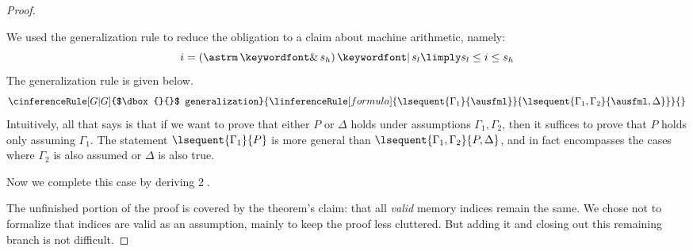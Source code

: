 \documentclass[11pt,twoside]{scrartcl}
\begin{document}
\begin{proof}
\begin{sequentdeduction}
{{  }
} {
}
\end{sequentdeduction}
We used the generalization rule to reduce the obligation to a claim about machine arithmetic, namely:
\begin{equation}
i = (\astrm \bitand s_h) \bitor s_l \limply s_l \le i \le s_h
\end{equation}
The generalization rule is given below.
\[
\cinferenceRule[G|G]{$\dbox{}{}$ generalization} %
{\linferenceRule[formula]
  {\lsequent{\Gamma_1}{\ausfml}}
  {\lsequent{\Gamma_1,\Gamma_2}{\ausfml,\Delta}}
}{}%
\]
Intuitively, all that  says is that if we want to prove that either $P$ or $\Delta$ holds under assumptions $\Gamma_1,\Gamma_2$, then it suffices to prove that $P$ holds only assuming $\Gamma_1$. The statement $\lsequent{\Gamma_1}{P}$ is more general than $\lsequent{\Gamma_1,\Gamma_2}{P,\Delta}$, and in fact encompasses the cases where $\Gamma_2$ is also assumed or $\Delta$ is also true.

Now we complete this case by deriving \textcircled{2}.
\begin{sequentdeduction}
 {
}
\end{sequentdeduction}
The unfinished portion of the proof is covered by the theorem's claim: that all \emph{valid} memory indices remain the same. We chose not to formalize that indices are valid as an assumption, mainly to keep the proof less cluttered. But adding it and closing out this remaining branch is not difficult.


\end{proof}
\end{document}
